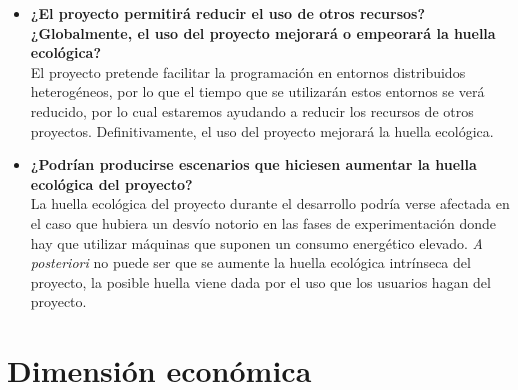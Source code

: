 \begin{itemize}
	\item \textbf{¿El proyecto permitirá reducir el uso de otros recursos? ¿Globalmente, el uso del proyecto
		mejorará o empeorará la huella ecológica?} \\
	
	El proyecto pretende facilitar la programación en entornos distribuidos heterogéneos, por lo que el tiempo que se utilizarán estos entornos se verá reducido, por lo cual estaremos ayudando a reducir los recursos de otros proyectos. Definitivamente, el uso del proyecto mejorará la huella ecológica.
	
	\item \textbf{¿Podrían producirse escenarios que hiciesen aumentar la huella ecológica del proyecto?} \\
	
	La huella ecológica del proyecto durante el desarrollo podría verse afectada en el caso que hubiera un desvío notorio en las fases de experimentación donde hay que utilizar máquinas que suponen un consumo energético elevado. \textit{A posteriori} no puede ser que se aumente la huella ecológica intrínseca del proyecto, la posible huella viene dada por el uso que los usuarios hagan del proyecto.
	
	
\end{itemize}

\section{Dimensión económica}


